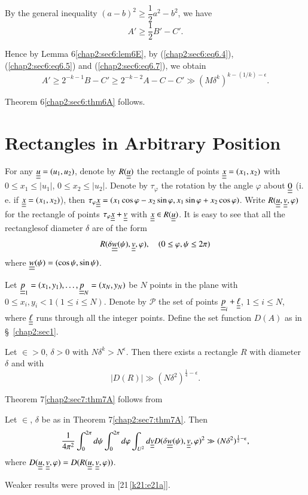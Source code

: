 By the general inequality $(a-b)^{2} \geq \dfrac{1}{2} a^{2} - b^{2}$, we have
$$
A' \geq \frac{1}{2} B' - C'.
$$

Hence by Lemma 6\ref{chap2:sec6:lem6E}, by (\ref{chap2:sec6:eq6.4}), (\ref{chap2:sec6:eq6.5}) and (\ref{chap2:sec6:eq6.7}), we obtain
$$
A' \geq 2^{-k-1} B - C' \geq 2^{-k-2} A - C - C' \gg (M \delta^{k})^{k-(1/k)-\epsilon}.
$$

Theorem 6\ref{chap2:sec6:thm6A} follows.

\section{Rectangles in Arbitrary Position}\label{chap2:sec7}

For any $\underline{\underline{u}} = (u_{1}, u_{2})$, denote by $R(\underline{\underline{u}})$ the rectangle of points $\underline{\underline{x}} = (x_{1}, x_{2})$ with $0 \leq x_{1} \leq |u_{1}|$, $0 \leq x_{2} \leq |u_{2}|$. Denote by $\tau_{\varphi}$ the rotation by the angle $\varphi$ about $\underline{\underline{0}}$ (i. e. if $\underline{\underline{x}} = (x_{1}, x_{2})$), then $\tau_{\varphi} \underline{\underline{x}} = (x_{1} \cos \varphi - x_{2} \sin \varphi, x_{1} \sin \varphi + x_{2} \cos \varphi)$. Write $R(\underline{\underline{u}}, \underline{\underline{v}}, \varphi)$ for the rectangle of points $\tau_{\varphi} \underline{\underline{x}} + \underline{\underline{v}}$ with $\underline{\underline{x}} \in R(\underline{\underline{u}})$. It is easy to see that all the rectangles\pageoriginale of diameter $\delta$ are of the 
form
$$
R(\delta \underline{\underline{w}} (\psi), \underline{\underline{v}}, \varphi), \quad(0 \leq \varphi, \psi \leq 2\pi)
$$
where $\underline{\underline{w}}(\psi) = (\cos \psi, \sin \psi)$.

Let $\underline{\underline{p}}_{1} = (x_{1}, y_{1}), \ldots, \underline{\underline{p}}_{N} = (x_{N}, y_{N})$ be $N$ points in the plane with $0 \leq x_{i}, y_{i} < 1 (1 \leq i \leq N)$. Denote by $\mathscr{P}$ the set of points $\underline{\underline{p}}_{i} + \underline{\underline{\ell}}$, $1 \leq i \leq N$, where $\underline{\underline{\ell}}$ runs through all the integer points. Define the set function $D(A)$ as in \S\ \ref{chap2:sec1}.

\begin{theorem}\label{chap2:sec7:thm7A}
Let $\in > 0$, $\delta > 0$ with $N \delta^{k} > N^{\epsilon}$. Then there exists a rectangle $R$ with diameter $\delta$ and with
\begin{equation*}
|D(R)| \gg (N \delta^{2})^{\frac{1}{4} - \epsilon} .
\end{equation*}
\end{theorem}

Theorem 7\ref{chap2:sec7:thm7A} follows from
\begin{theorem}\label{chap2:sec7:thm7B}
Let $\in$, $\delta$ be as in Theorem 7\ref{chap2:sec7:thm7A}. Then
\begin{equation*}
\frac{1}{4\pi^{2}} \int_{0}^{2\pi} d\psi \int_{0}^{2\pi} d\varphi \int_{U^{2}} d\underline{\underline{v}} D(\delta \underline{\underline{w}}(\psi), \underline{\underline{v}}, \varphi)^{2} \gg (N \delta^{2})^{\frac{1}{2} - \epsilon},
\end{equation*}
where $D(\underline{\underline{u}}, \underline{\underline{v}}, \varphi) = D(R(\underline{\underline{u}}, \underline{\underline{v}}, \varphi))$.
\end{theorem}
Weaker results were proved in [21\,\ref{k21:e21a}].

